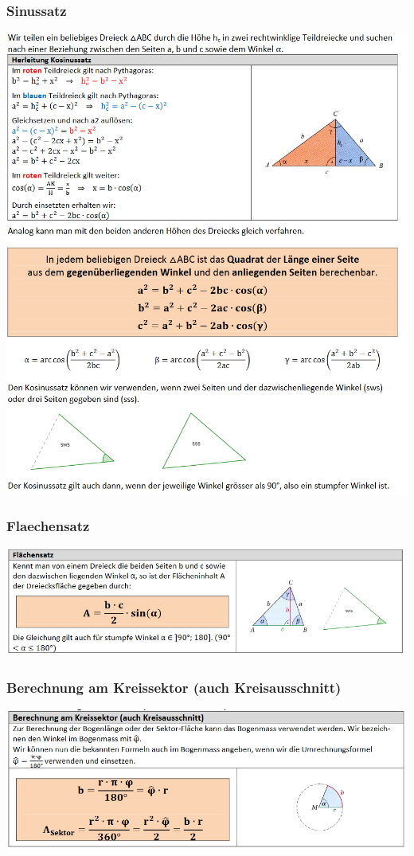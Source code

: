 \subsubsection{Sinussatz}
\includegraphics[scale=0.7]{kosinussatz.PNG}

\subsubsection{Flaechensatz}
\includegraphics[scale=0.7]{flaechensatz.PNG}
\subsubsection{Berechnung am Kreissektor (auch Kreisausschnitt)}
\includegraphics[scale=0.7]{kreissektor.PNG}
